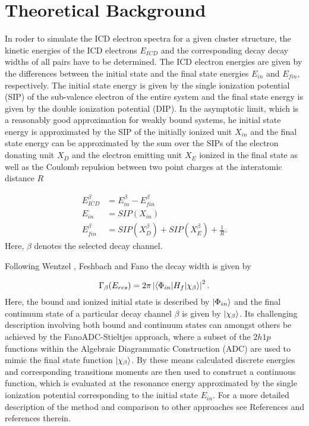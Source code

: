 \section{Theoretical Background}
\label{sec:theory}

In roder to simulate the ICD electron spectra for a given cluster structure,
the kinetic energies of the ICD electrons $E_{ICD}$ and the corresponding decay
decay widths of all pairs have to be determined. The ICD electron energies
are given by the differences between the initial state and the final state
energies $E_{in}$ and $E_{fin}$, respectively. The initial state energy
is given by the single ionization potential (SIP) of the sub-valence electron
of the entire system
and the final state energy is given by the double ionization potential (DIP).
In the asymptotic limit, which is a reasonably good approximation for
weakly bound systems, he initial state energy is approximated by the SIP
of the initially ionized unit $X_{in}$ and the final state energy can be
approximated
by the sum over the SIPs of the electron donating unit $X_D$ and the electron
emitting unit $X_E$ ionized in the final state as well as the
Coulomb repulsion between two point charges at the interatomic distance $R$

\begin{align}
 E_{ICD}^\beta &= E_{in}^\beta - E_{fin}^\beta \label{equation:E_sec}\\
 E_{in}        &= SIP(X_{in}) \label{equation:E_in}\\          
 E_{fin}^\beta &= SIP(X_{D}^\beta) + SIP(X_{E}^\beta) + \frac 1R
           \label{equation:E_fin}                . 
\end{align}
Here, $\beta$ denotes the selected decay channel.

Following Wentzel \cite{Wentzel27}, Feshbach\cite{Feshbach58,Feshbach62}
and Fano \cite{Fano61} the decay width is given by

\begin{equation}
 \Gamma_{\beta}(E_{res}) = 2\pi \left|
                           \braket{\Phi_{in}| H_f |\chi_{\beta}}
                           \right|^2   .
\end{equation}
Here, the bound and ionized initial state is described by $\ket{\Phi_{in}}$ and
the final continuum state of a particular decay channel $\beta$ is
given by $\ket{\chi_{\beta}}$.
Its challenging description involving both bound and continuum states can
amongst others be achieved by the FanoADC-Stieltjes approach, where a
subset of the $2h1p$ functions within the Algebraic Diagrammatic Construction
(ADC) are used to mimic the final state function $\ket{\chi_{\beta}}$.
By these means calculated discrete energies and corresponding transitions
moments are then used to construct a continuous function, which is evaluated
at the resonance energy approximated by the single ionization potential
corresponding to the initial state $E_{in}$. For a more detailed
description of the method and comparison to other approaches see References
\cite{Averbukh05,Fasshauer15_1} and references therein.
